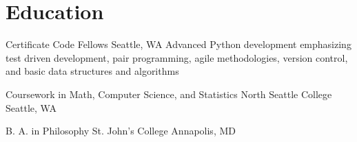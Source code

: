 \documentclass[10pt,a4paper,sans]{moderncv}        %
\begin{document}
\section{Education}
 {Certificate} {Code Fellows} {Seattle, WA} {} {Advanced Python development emphasizing test driven development, pair programming, agile methodologies, version control, and basic data structures and algorithms}

 {Coursework in Math, Computer Science, and Statistics}
{North Seattle College} {Seattle, WA} {} {}

 {B. A. in Philosophy} {St. John's College}
{Annapolis, MD} {} {}
\end{document}

